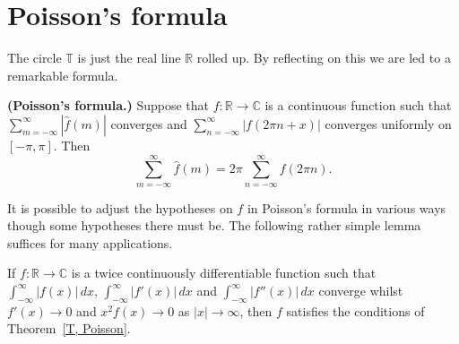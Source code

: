\section{Poisson's formula}\label{S, Poisson}
The circle ${\mathbb T}$ is just
the real line ${\mathbb R}$ rolled up. By reflecting on this
we are led to a remarkable formula.
\begin{theorem}\label{T, Poisson}{\bf (Poisson's formula.)}
Suppose that
$f:{\mathbb R}\rightarrow{\mathbb C}$ is a continuous
function such that $\sum_{m=-\infty}^{\infty}|\hat{f}(m)|$
converges and $\sum_{n=-\infty}^{\infty}|f(2\pi n+x)|$
converges uniformly on $[-\pi,\pi]$. Then
\[\sum_{m=-\infty}^{\infty}\hat{f}(m)=
2\pi\sum_{n=-\infty}^{\infty}f(2\pi n).\]
\end{theorem}
It is possible to adjust the hypotheses on $f$
in Poisson's formula in various ways
though some hypotheses there must be. The following
rather simple lemma suffices for many applications.
\begin{lemma}\label{L, simple needs}
If $f:{\mathbb R}\rightarrow{\mathbb C}$
is a twice continuously differentiable function such
that $\int_{-\infty}^{\infty}|f(x)|\,dx$,
$\int_{-\infty}^{\infty}|f'(x)|\,dx$
and $\int_{-\infty}^{\infty}|f''(x)|\,dx$
converge whilst $f'(x)\rightarrow 0$
and $x^{2}f(x)\rightarrow 0$ as $|x|\rightarrow\infty$,
then $f$ satisfies the conditions of Theorem~\ref{T, Poisson}.
\end{lemma}

